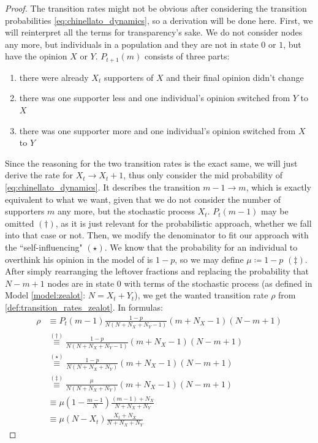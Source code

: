 \documentclass[12pt,a4paper,twoside]{article}
\begin{document}
\begin{proof}
The transition rates might not be obvious after considering the transition probabilities \eqref{eq:chinellato_dynamics}, so a derivation will be done here. First, we will reinterpret all the terms for transparency's sake. We do not consider nodes any more, but individuals in a population and they are not in state $0$ or $1$, but have the opinion $X$ or $Y$. $P_{t+1}\left(m\right)$ consists of three parts: 
\begin{enumerate}
	\item there were already $X_t$ supporters of $X$ and their final opinion didn't change
	\item there was one supporter less and one individual's opinion switched from $Y$ to $X$
	\item there was one supporter more and one individual's opinion switched from $X$ to $Y$
\end{enumerate}

Since the reasoning for the two transition rates is the exact same, we will just derive the rate for $X_t \rightarrow X_t + 1$, thus only consider the mid probability of \eqref{eq:chinellato_dynamics}. It describes the transition $m -1 \rightarrow m$, which is exactly equivalent to what we want, given that we do not consider the number of supporters $m$ any more, but the stochastic process $X_t$. $P_t \left(m-1\right)$ may be omitted $(\dagger)$, as it is just relevant for the probabilistic approach, whether we fall into that case or not. Then, we modify the denominator to fit our approach with the ``self-influencing" $(\star)$. We know that the probability for an individual to overthink his opinion in the model of \cite{Aguiar2011, Chinellato2015} is $1-p$, so we may define $\mu \coloneqq 1-p$ $(\ddagger)$. After simply rearranging the leftover fractions and replacing the probability that $N - m + 1$ nodes are in state $0$ with terms of the stochastic process (as defined in Model \ref{model:zealot}: $N = X_t + Y_t$), we get the wanted transition rate $\rho$ from \eqref{def:transition_rates_zealot}. In formulas: %
\begin{align*}
	\rho &\equiv P_t\left(m-1\right)\frac{1-p}{N\left(N+N_X+N_Y-1\right)}\left(m+N_X-1\right)\left(N-m+1\right)\\
	&\overset{(\dagger)}{\equiv} \frac{1-p}{N\left(N+N_X+N_Y-1\right)}\left(m+N_X-1\right)\left(N-m+1\right)\\
	&\overset{(\star)}{\equiv} \frac{1-p}{N(N+N_X+N_Y)}\left(m+N_X-1\right)\left(N-m+1\right)\\
	&\overset{(\ddagger)}{\equiv} \frac{\mu}{N(N+N_X+N_Y)}\left(m+N_X-1\right)\left(N-m+1\right)\\
	&\equiv \mu \left(1-\frac{m-1}{N}\right)\frac{\left(m-1\right) + N_X}{N + N_X + N_Y}\\
	&\equiv \mu\left(N-X_t\right)\frac{X_t + N_X}{N + N_X + N_Y}
\end{align*}
\end{proof}
\end{document}
